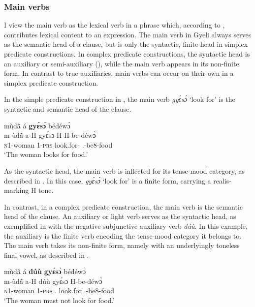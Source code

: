 \subsubsection{Main verbs}
\label{sec:MainVerbs}

I view the main verb as the lexical verb in a phrase which, according to \citet[796]{anderson2011a}, contributes lexical content to an expression.  The main verb in Gyeli always serves as the semantic head of a clause, but is only the syntactic, finite head in simplex predicate constructions. In complex predicate constructions, the syntactic head is an auxiliary or semi-auxiliary (), while the main verb appears in its non-finite form.  In contrast to true auxiliaries, main verbs can occur on their own in a simplex predicate construction. 


In the simple predicate construction in , the main verb {\itshape gyɛ́sɔ́} `look for' is the syntactic and semantic head of the clause.

\ea \label{simPred}
  \glll  mùdã̂ á {\bfseries gyɛ́sɔ́} bédéwɔ̀ \\
        m-ùdã̂ a-H gyɛ́sɔ-H H-be-déwɔ̀  \\
           \textsc{n}1-woman 1-\textsc{prs} look.for-{\R} {\OBJ}.{\LINK}-be8-food  \\
    \trans `The woman looks for food.'
\z

\noindent As the syntactic head, the main verb is inflected for its tense-mood category, as described in . In this case, {\itshape gyɛ́sɔ́} `look for' is a finite form, carrying a realis-marking H tone.

In contrast, in a complex predicate construction, the main verb is the semantic head of the clause.  An auxiliary or light verb serves as the syntactic head, as exemplified in  with the negative subjunctive auxiliary verb {\itshape dúù}. In this example, the auxiliary is the finite verb encoding the tense-mood category it belongs to. The main verb takes its non-finite form, namely with an underlyingly toneless final vowel, as described in .

\ea \label{simPredb}
  \glll  mùdã̂ á {\bfseries dúù} {\bfseries gyɛ́sɔ̀} bédéwɔ̀ \\
        m-ùdã̂ a-H dúù gyɛ́sɔ H-be-déwɔ̀  \\
           \textsc{n}1-woman 1-\textsc{prs} {\NEG}.{\SBJV} look.for {\OBJ}.{\LINK}-be8-food  \\
    \trans `The woman must not look for food.'
\z

